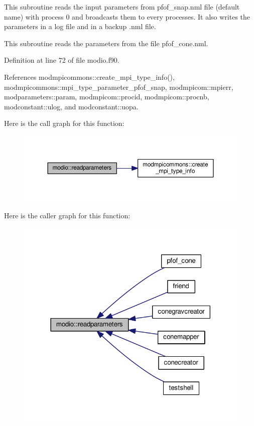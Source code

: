 This subroutine reads the input parameters from pfof\+\_\+snap.\+nml file (default name) with process 0 and broadcasts them to every processes. It also writes the parameters in a log file and in a backup .nml file. 

This subroutine reads the parameters from the file pfof\+\_\+cone.\+nml. 

Definition at line 72 of file modio.\+f90.



References modmpicommons\+::create\+\_\+mpi\+\_\+type\+\_\+info(), modmpicommons\+::mpi\+\_\+type\+\_\+parameter\+\_\+pfof\+\_\+snap, modmpicom\+::mpierr, modparameters\+::param, modmpicom\+::procid, modmpicom\+::procnb, modconstant\+::ulog, and modconstant\+::uopa.



Here is the call graph for this function\+:\nopagebreak
\begin{figure}[H]
\begin{center}
\leavevmode
\includegraphics[width=350pt]{namespacemodio_aa5e6b5f45cf8cfc091e8e7ff25a97c68_cgraph}
\end{center}
\end{figure}




Here is the caller graph for this function\+:\nopagebreak
\begin{figure}[H]
\begin{center}
\leavevmode
\includegraphics[width=318pt]{namespacemodio_aa5e6b5f45cf8cfc091e8e7ff25a97c68_icgraph}
\end{center}
\end{figure}


